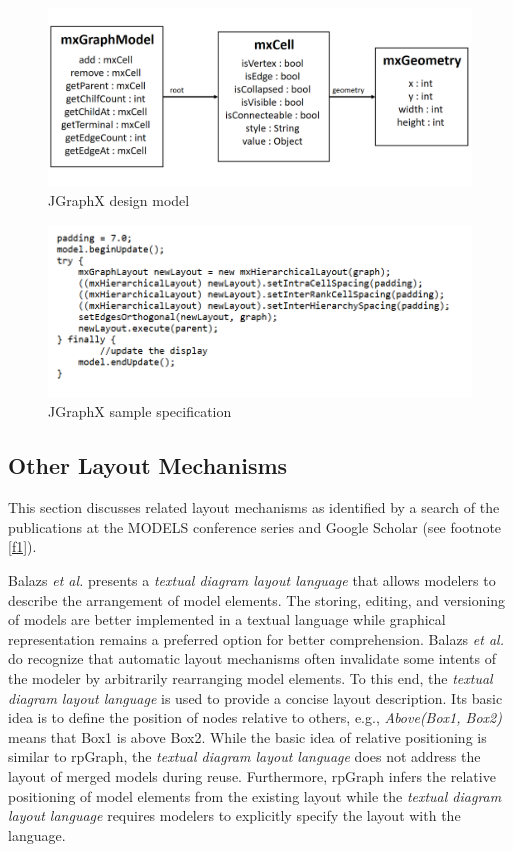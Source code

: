 \begin{figure}
	\includegraphics[width=\linewidth]{mxGraph.PNG}
	\caption{JGraphX design model \cite{mxGraph}}
	\label{fig : JGraphX Model}
\end{figure}

\begin{figure}
	\includegraphics[width=\linewidth]{jgraphx.PNG}
	\caption{JGraphX sample specification}
	\label{fig : graphx samlpe code}
\end{figure}

\subsection{Other Layout Mechanisms} \label{RW}
This section discusses related layout mechanisms as identified by a search of the publications at the MODELS conference series and Google Scholar (see footnote \ref{f1}). 

Balazs \textit{et al.} \cite{gregorics2015textual} presents a \textit{textual diagram layout language} that allows modelers to describe the arrangement of model elements. The storing, editing, and versioning of models are better implemented in a textual language while graphical representation remains a preferred option for better comprehension. Balazs \textit{et al.} do recognize that automatic layout mechanisms often invalidate some intents of the modeler by arbitrarily rearranging model elements. To this end, the \textit{textual diagram layout language} is used to provide a concise layout description. Its basic idea is to define the position of nodes relative to others, e.g., \textit{Above(Box1, Box2)} means that Box1 is above Box2. While the basic idea of relative positioning is similar to rpGraph, the \textit{textual diagram layout language} does not address the layout of merged models during reuse. Furthermore, rpGraph infers the relative positioning of model elements from the existing layout while the \textit{textual diagram layout language} requires modelers to explicitly specify the layout  with the language.

